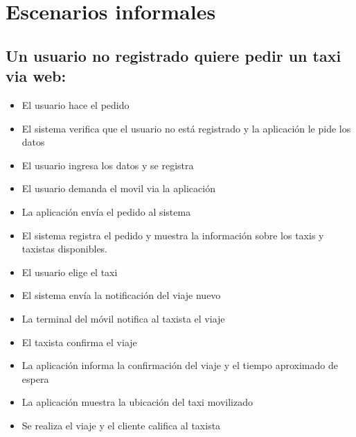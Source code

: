 \documentclass[a4paper]{article}
\begin{document}
\section{Escenarios informales}

\subsection{Un usuario no registrado quiere pedir un taxi via web:}
\begin{itemize}
\item El usuario hace el pedido
\item El sistema verifica que el usuario no est\'a registrado y la aplicaci\'on le pide los datos
\item El usuario ingresa los datos y se registra
\item El usuario demanda el movil via la aplicaci\'on
\item La aplicaci\'on env\'ia el pedido al sistema
\item El sistema registra el pedido y muestra la informaci\'on sobre los taxis y taxistas disponibles.
\item El usuario elige el taxi
\item El sistema env\'ia la notificaci\'on del viaje nuevo
\item La terminal del m\'ovil notifica al taxista el viaje
\item El taxista confirma el viaje
\item La aplicaci\'on informa la confirmaci\'on del viaje y el tiempo aproximado de espera
\item La aplicaci\'on muestra la ubicaci\'on del taxi movilizado
\item Se realiza el viaje y el cliente califica al taxista
\end{itemize}
\end{document}
